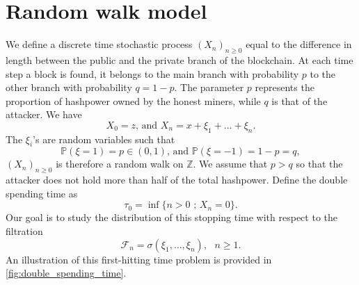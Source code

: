 \section{Random walk model}\label{sec:double_spending_rw}
We define a discrete time stochastic process $(X_n)_{n\geq0}$ equal to the difference in length between the public and the private branch of the blockchain. At each time step a block is found, it belongs to the main branch with probability $p$ to the other branch with probability $q=1-p$. The parameter $p$ represents the proportion of hashpower owned by the honest miners, while $q$ is that of the attacker. We have
$$
X_0 = z\text{, and  }X_n = x+\xi_1+\ldots+ \xi_n.
$$
The $\xi_i$'s are \iid random variables such that 
$$
\mathbb{P}(\xi=1) = p\in (0,1)\text{, and }\mathbb{P}(\xi=-1) = 1-p=q,
$$ 
$(X_n)_{n\geq0}$ is therefore a random walk on $\mathbb{Z}$. We assume that $p>q$ so that the attacker does not hold more than half of the total hashpower. Define the double spending time as 
$$
{\tau_0} = \inf\{n>0\text{ ; }X_n = 0\}.
$$
Our goal is to study the distribution of this stopping time with respect to the filtration 
$$
\mathcal{F}_n = \sigma(\xi_1,\ldots, \xi_n),\text{ }n\geq1.
$$ 
An illustration of this first-hitting time problem is provided in \cref{fig:double_spending_time}.
